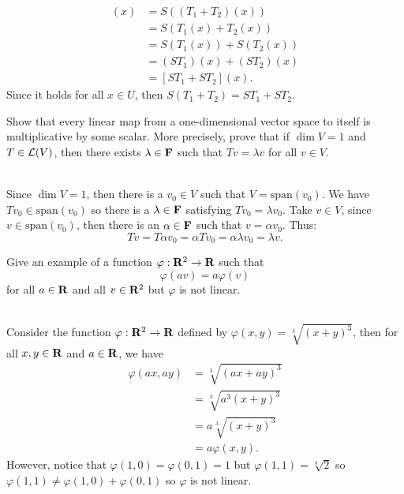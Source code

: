 \begin{solution}
\begin{itemize}
        \begin{align*}
            [S(T_1 + T_2)](x) &= S((T_1 + T_2)(x)) \\
            &= S(T_1(x) + T_2(x)) \\
            &= S(T_1(x)) + S(T_2(x)) \\
            &= (S T_1)(x) + (S T_2)(x) \\
            &= [ST_1 + ST_2](x).
        \end{align*}
        Since it holds for all $x \in U$, then $S(T_1 + T_2) = ST_1 + ST_2$.\\
    \end{itemize}
\end{solution}

\begin{exercise}
    Show that every linear map from a one-dimensional vector space to itself is multiplicative by some scalar. More precisely, prove that if $\dim V = 1$ and $T \in \mathcal{L}(V)$, then there exists $\lambda \in \mathbf{F}$ such that $Tv = \lambda v$ for all $v \in V$. \\
\end{exercise}

\begin{solution}
    \\ Since $\dim V = 1$, then there is a $v_0 \in V$ such that $V = \text{span}(v_0)$. We have $Tv_0 \in \text{span}(v_0)$ so there is a $\lambda \in \mathbf{F}$ satisfying $Tv_0 = \lambda v_0$. Take $v \in V$, since $v \in \text{span}(v_0)$, then there is an $\alpha \in \mathbf{F}$ such that $v = \alpha v_0$. Thus:
    $$Tv = T\alpha v_0 = \alpha Tv_0 = \alpha \lambda v_0 = \lambda v.$$
\end{solution}

\begin{exercise}
    Give an example of a function $\varphi : \mathbf{R}^2 \to \mathbf{R}$ such that
    $$\varphi(av) = a\varphi(v)$$
    for all $a \in \mathbf{R}$ and all $v \in \mathbf{R}^2$ but $\varphi$ is not linear.\\
\end{exercise}

\begin{solution}
    \\ Consider the function $\varphi : \mathbf{R}^2 \to \mathbf{R}$ defined by $\varphi(x,y) = \sqrt[3]{(x + y)^3}$, then for all $x,y \in \mathbf{R}$ and $a \in \mathbf{R}$, we have
    \begin{align*}
        \varphi(ax, ay) &= \sqrt[3]{(ax + ay)^3} \\
        &= \sqrt[3]{a^3(x + y)^3} \\
        &= a\sqrt[3]{(x + y)^3} \\
        &= a \varphi(x,y).
    \end{align*}
    However, notice that $\varphi(1, 0) = \varphi(0,1) = 1$ but $\varphi(1, 1) = \sqrt[3]{2}$ so $\varphi(1, 1) \neq \varphi(1, 0) + \varphi(0,1)$ so $\varphi$ is not linear. \\
\end{solution}

